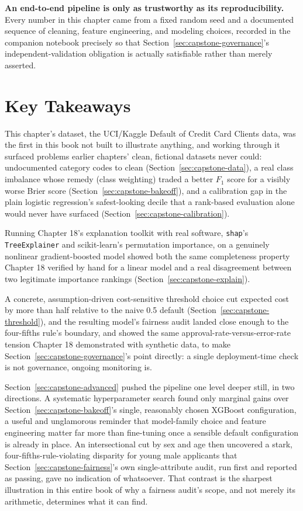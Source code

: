 \documentclass[../ai_in_finance]{subfiles}
\begin{document}
\textbf{An end-to-end pipeline is only as trustworthy as its reproducibility.} Every number in this chapter came from a fixed random seed and a documented sequence of cleaning, feature engineering, and modeling choices, recorded in the companion notebook precisely so that Section~\ref{sec:capstone-governance}'s independent-validation obligation is actually satisfiable rather than merely asserted.

\section{Key Takeaways}

This chapter's dataset, the UCI/Kaggle Default of Credit Card Clients data, was the first in this book not built to illustrate anything, and working through it surfaced problems earlier chapters' clean, fictional datasets never could: undocumented category codes to clean (Section~\ref{sec:capstone-data}), a real class imbalance whose remedy (class weighting) traded a better $F_1$ score for a visibly worse Brier score (Section~\ref{sec:capstone-bakeoff}), and a calibration gap in the plain logistic regression's safest-looking decile that a rank-based evaluation alone would never have surfaced (Section~\ref{sec:capstone-calibration}).

Running Chapter 18's explanation toolkit with real software, \texttt{shap}'s \texttt{TreeExplainer} and scikit-learn's permutation importance, on a genuinely nonlinear gradient-boosted model showed both the same completeness property Chapter 18 verified by hand for a linear model and a real disagreement between two legitimate importance rankings (Section~\ref{sec:capstone-explain}).

A concrete, assumption-driven cost-sensitive threshold choice cut expected cost by more than half relative to the naive 0.5 default (Section~\ref{sec:capstone-threshold}), and the resulting model's fairness audit landed close enough to the four-fifths rule's boundary, and showed the same approval-rate-versus-error-rate tension Chapter 18 demonstrated with synthetic data, to make Section~\ref{sec:capstone-governance}'s point directly: a single deployment-time check is not governance, ongoing monitoring is.

Section~\ref{sec:capstone-advanced} pushed the pipeline one level deeper still, in two directions. A systematic hyperparameter search found only marginal gains over Section~\ref{sec:capstone-bakeoff}'s single, reasonably chosen XGBoost configuration, a useful and unglamorous reminder that model-family choice and feature engineering matter far more than fine-tuning once a sensible default configuration is already in place. An intersectional cut by sex and age then uncovered a stark, four-fifths-rule-violating disparity for young male applicants that Section~\ref{sec:capstone-fairness}'s own single-attribute audit, run first and reported as passing, gave no indication of whatsoever. That contrast is the sharpest illustration in this entire book of why a fairness audit's scope, and not merely its arithmetic, determines what it can find.
\end{document}
